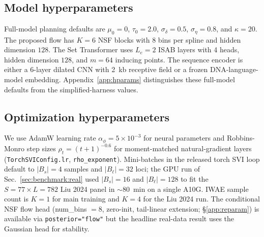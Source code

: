 \subsection{Model hyperparameters}
Full-model planning defaults are $\mu_0=0$, $\tau_0=2.0$, $\sigma_\delta=0.5$, $\sigma_\eta=0.8$, and $\kappa=20$. The proposed flow has $K=6$ NSF blocks with 8 bins per spline and hidden dimension $128$. The Set Transformer uses $L_e=2$ ISAB layers with 4 heads, hidden dimension $128$, and $m=64$ inducing points. The sequence encoder is either a 6-layer dilated CNN with 2~kb receptive field or a frozen DNA-language-model embedding. Appendix~\ref{app:hparams} distinguishes these full-model defaults from the simplified-harness values.

\subsection{Optimization hyperparameters}
We use AdamW learning rate $\alpha_\phi=5\times 10^{-3}$ for neural parameters and Robbins-Monro step sizes $\rho_t=(t+1)^{-0.6}$ for moment-matched natural-gradient layers (\texttt{TorchSVIConfig.lr}, \texttt{rho\_exponent}). Mini-batches in the released torch SVI loop default to $|B_s|=4$ samples and $|B_\ell|=32$ loci; the GPU run of Sec.~\ref{sec:benchmark:real} used $|B_s|=16$ and $|B_\ell|=128$ to fit the $S=77 \times L=782$ Liu 2024 panel in $\sim$80~min on a single A10G. IWAE sample count is $K=1$ for main training and $K=4$ for the Liu 2024 run. The conditional NSF flow head (num\_bins $=8$, zero-init, tail-linear extension; \S\ref{app:reparam}) is available via \texttt{posterior="flow"} but the headline real-data result uses the Gaussian head for stability.

